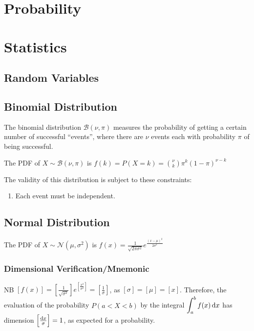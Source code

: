 \documentclass[a4paper,11pt]{article}
\begin{document}
    \section{Probability}

    \section{Statistics}

    \subsection{Random Variables}

    \subsection{Binomial Distribution}


    The binomial distribution $\mathcal B(\nu, \pi)$ measures the probability of
    getting a certain number of successful ``events'', where there are $\nu$
    events each with probability $\pi$ of being successful.

    The PDF of $X \sim \mathcal B(\nu, \pi)$ is
    $\displaystyle f(k) = P(X = k) = {\nu \choose k} \pi^k (1 - \pi)^{\nu - k}$

    The validity of this distribution is subject to these constraints:
    \begin{enumerate}
    \item Each event must be independent.
    \end{enumerate}

    \subsection{Normal Distribution}


    The PDF of $X \sim \mathcal N(\mu, \sigma^2)$ is
    $\displaystyle f(x) = \frac{1}{\sqrt{2\pi\sigma^2}}
                            e^{\frac{(x - \mu)^2}{2\sigma^2}}$

    \subsubsection{Dimensional Verification/Mnemonic}

    NB $\displaystyle\left[f(x)\right] =
        \left[\frac 1{\sqrt{\sigma^2}}\right]
        e^{\left[\frac{x^2}{\sigma^2}\right]}
      = \left[\frac 1\sigma\right]$, as
    $\left[\sigma\right] = \left[\mu\right] = \left[x\right]$. Therefore, the
    evaluation of the probability $P(a < X < b)$ by the integral
    $\displaystyle\int_a^bf(x)\dif x$ has dimension
    $\left[\frac{\dif x}{\sigma}\right] = 1$, as expected for a probability.
\end{document}
